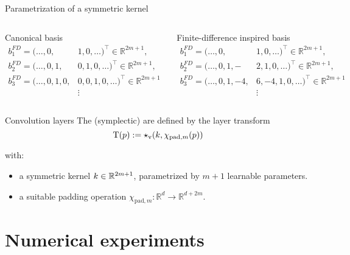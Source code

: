 \begin{frame}[c]{Parametrization of a symmetric kernel}
  \vspace{0.3cm}
  \begin{columns}
    \centering
    Canonical basis
    \begin{align*}
      b_1^{FD} = (\dots, 0,& 1,0, \dots)^\top \in \mathbb{R}^{2m+1},\\
      b_2^{FD} = (\dots, 0, 1,&0,1, 0, \dots)^\top \in \mathbb{R}^{2m+1},\\
      b_3^{FD} = (\dots, 0, 1,0,& 0,0,1, 0, \dots)^\top \in \mathbb{R}^{2m+1} \\
      &\vdots
    \end{align*}

    \centering
    Finite-difference inspired basis
    \begin{align*}
      b_1^{FD} = (\dots, 0,& 1,0, \dots)^\top \in \mathbb{R}^{2m+1},\\
      b_2^{FD} = (\dots, 0, 1,-&2,1, 0, \dots)^\top \in \mathbb{R}^{2m+1},\\
      b_3^{FD} = (\dots, 0, 1,-4,& 6,-4,1, 0, \dots)^\top \in \mathbb{R}^{2m+1} \\
      &\vdots
    \end{align*}
  \end{columns}
\end{frame}

\begin{frame}[c]{Convolution layers}
  The (symplectic)  are defined by the layer transform
  \begin{equation*}
    \mathrm{T}(p) := \star_{\text{v}}(k,\chi_{\text{pad},m}(p))
  \end{equation*}

  with:
  \begin{itemize}
    \item a symmetric kernel $k \in \mathbb{R}^{2m+1}$, 
    parametrized by $m+1$ learnable parameters.
    \item a suitable padding operation 
    $\chi_{\text{pad},m} : \mathbb{R}^d \to \mathbb{R}^{d+2m}$.
  \end{itemize}
\end{frame}

\section{Numerical experiments}

